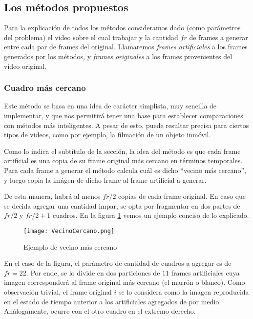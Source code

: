 \subsection{Los m\'etodos propuestos}

Para la explicación de todos los métodos consideramos dado (como parámetros del problema) el video sobre el cual trabajar y la cantidad $fr$ de frames a generar entre cada par de frames del original. Llamaremos \emph{frames artificiales} a los frames generados por los métodos, y \emph{frames originales} a los frames provenientes del video original.

\subsubsection{Cuadro m\'as cercano}
Este m\'etodo se basa en una idea de car\'acter simplista, muy sencilla de implementar, y que nos permitirá tener una base para establecer comparaciones con métodos más inteligentes. A pesar de esto, puede resultar precisa para ciertos tipos de videos, como por ejemplo, la filmaci\'on de un objeto inmóvil.

Como lo indica el subt\'itulo de la secci\'on, la idea del método es que cada frame artificial es una copia de su frame original más cercano en términos temporales. Para cada frame a generar el método calcula cuál es dicho ``vecino más cercano'', y luego copia la im\'agen de dicho frame al frame artificial a generar. 

De esta manera, habr\'a al menos $fr/2$ copias de cada frame original. En caso que se decida agregar una cantidad impar, se opta por fragmentar en dos partes de $fr/2$ y $fr/2+1$ cuadros. En la figura \ref{fig:vecino} vemos un ejemplo conciso de lo explicado.

\begin{figure}[h!]
  \centering
    \texttt{[image: VecinoCercano.png]}
     \caption{Ejemplo de vecino m\'as cercano}\label{fig:vecino}
\end{figure}
\noindent

En el caso de la figura, el par\'ametro de cantidad de cuadros a agregar es de $fr = 22$. Por ende, se lo divide en dos particiones de $11$ frames artificiales cuya imagen corresponder\'a al frame original m\'as cercano (el marr\'on o blanco). Como observaci\'on trivial, el frame original $i$ se lo considera como la imagen reproducida en el estado de tiempo anterior a los artificiales agregados de por medio. An\'alogamente, ocurre con el otro cuadro en el extremo derecho.

